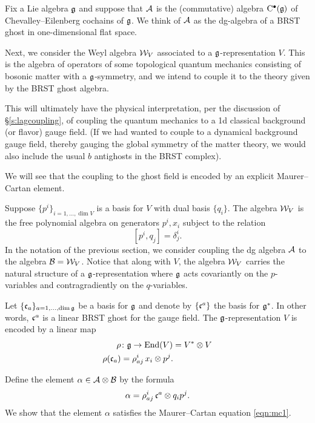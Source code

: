\documentclass[11pt]{amsart}
\def\natalie#1{{\textcolor{green!65!black}{NMP: {#1}}}}
\begin{document}
Fix a Lie algebra $\mathfrak g$ and
suppose that $\mathcal A$ is the (commutative) algebra ${\rm C}^\bullet(\mathfrak g)$ of Chevalley--Eilenberg cochains of $\mathfrak g$. 
We think of $\mathcal A$ as the dg-algebra of a BRST ghost in one-dimensional flat space. 

Next, we consider the Weyl algebra $\mathcal W_V$ associated to a $\mathfrak g$-representation $V$. This is the algebra of operators of some topological quantum mechanics consisting of bosonic matter with a $\mathfrak g$-symmetry, and we intend to couple it to the theory given by the BRST ghost algebra. 

This will ultimately have the physical interpretation, per the discussion of \S \ref{s:lagcoupling},  of coupling the quantum mechanics to a 1d classical background (or flavor) gauge field. (If we had wanted to couple to a dynamical background gauge field, thereby gauging the global symmetry of the matter theory, we would also include the usual $b$ antighosts in the BRST complex). 

We will see that the coupling to the ghost field is encoded by an explicit Maurer--Cartan element. 

Suppose $\{p^i\}_{i=1,\ldots,\dim V}$ is a basis for $V$ with dual basis $\{q_i\}$. 
The algebra $\mathcal W_V$ is the free polynomial algebra on generators $p^i, x_i$ subject to the relation 
\[
[p^i, q_j] = \delta_j^i .
\]
In the notation of the previous section, we consider coupling the dg algebra $\mathcal A$ to the algebra $\mathcal B = \mathcal W_V$. 
Notice that along with $V$, the algebra $\mathcal W_V$ carries the natural structure of a $\mathfrak g$-representation where $\mathfrak g$ acts covariantly on the $p$-variables and contragradiently on the $q$-variables. 

Let $\{\mathfrak c_a\}_{a=1,\dots,\dim \mathfrak g}$ be a basis for $\mathfrak g$ and denote by $\{\mathfrak c^a\}$ the basis for $\mathfrak g^*$. 
In other words, $\mathfrak c^a$ is a linear BRST ghost for the gauge field. 
The $\mathfrak g$-representation $V$ is encoded by a linear map
\begin{align*}
\rho & \colon \mathfrak g \to {\rm End}(V) = V^* \otimes V \\
\rho(\mathfrak c_a) & = \rho_{aj}^i \, x_i \otimes p^j .
\end{align*}

Define the element $\alpha \in \mathcal A \otimes \mathcal B$ by the formula
\[
\alpha = \rho_{aj}^i \, \mathfrak c^a \otimes q_i p^j .
\]
We show that the element $\alpha$ satisfies the Maurer--Cartan equation \eqref{eqn:mc1}. 

\end{document}
